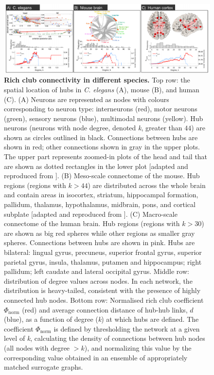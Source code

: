 \begin{figure}[h!]
\begin{center}
\includegraphics[width=1\textwidth]{Chapter3/Ch3Fig2.pdf}%
\end{center}
\caption{\textbf{Rich club connectivity in different species.} Top row: the spatial location of hubs in \textit{C. elegans} (A), mouse (B), and human (C).
(A) Neurons are represented as nodes with colours corresponding to neuron type: interneurons (red), motor neurons (green), sensory neurons (blue), multimodal neurons (yellow). Hub neurons (neurons with node degree, denoted \textit{k}, greater than $44$) are shown as circles outlined in black. Connections between hubs are shown in red; other connections shown in gray in the upper plots. The upper part represents zoomed-in plots of the head and tail that are shown as dotted rectangles in the lower plot [adapted and reproduced from \citet{Arnatkeviciute2018}].
(B) Meso-scale connectome of the mouse. Hub regions (regions with $k > 44$) are distributed across the whole brain and contain areas in isocortex, striatum, hippocampal formation, pallidum, thalamus, hypothalamus, midbrain, pons, and cortical subplate [adapted and reproduced from \citet{Fulcher2016}].
(C) Macro-scale connectome of the human brain. Hub regions (regions with $k > 30$) are shown as big red spheres while other regions as smaller gray spheres. Connections between hubs are shown in pink. Hubs are bilateral: lingual gyrus, precuneus, superior frontal gyrus, superior parietal gyrus, insula, thalamus, putamen and hippocampus; right pallidum; left caudate and lateral occipital gyrus.
Middle row: distribution of degree values across nodes. In each network, the distribution is heavy-tailed, consistent with the presence of highly connected hub nodes.
Bottom row: Normalised rich club coefficient $\Phi_\mathrm{norm}$ (red) and average connection distance of hub-hub links, $d$ (blue), as a function of degree (\textit{k}) at which hubs are defined.
The coefficient $\Phi_\mathrm{norm}$ is defined by thresholding the network at a given level of \textit{k}, calculating the density of connections between hub nodes (all nodes with degree $ > k$), and normalizing this value by the corresponding value obtained in an ensemble of appropriately matched surrogate graphs.
}
\end{figure}
